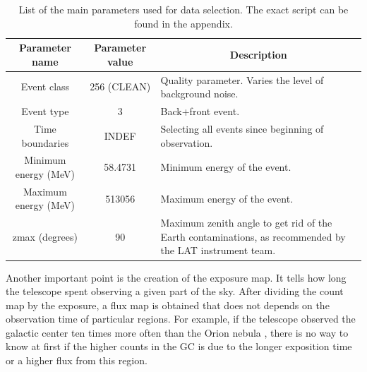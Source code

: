 \begin{center}
\begin{table}[h]
\centering
\begin{tabular}{|c|c|p{6.5cm}|}
\hline
\multicolumn{1}{|c|}{\textbf{Parameter name}} & \textbf{Parameter value} & \multicolumn{1}{c|}{\textbf{Description}}                                                                   \\ \hline
Event class                         & 256 (CLEAN)              & Quality parameter. Varies the level of background noise.                                                    \\ \hline
Event type                          & 3                        & Back+front event.                                                                                           \\ \hline
Time boundaries                     & INDEF                    & Selecting all events since beginning of observation.                                                        \\ \hline
Minimum energy (MeV)                & 58.4731                  & Minimum energy of the event.                                                                                \\ \hline
Maximum energy (MeV)                & 513056                   & Maximum energy of the event.                                                                                \\ \hline
zmax (degrees)                      & 90                       & Maximum zenith angle to get rid of the Earth contaminations, as recommended by the LAT instrument team. \\ \hline
\end{tabular}
\caption[Main parameter for Fermi data selection.]{List of the main parameters used for data selection. The exact script can be found in the appendix.}
\label{tab:fermi_selection_parameters}
\end{table}
\end{center}


Another important point is the creation of the exposure map. It tells how long the telescope spent observing a given part of the sky. After dividing the count map by the exposure, a flux map is obtained that does not depends on the observation time of particular regions. For example, if the telescope observed the galactic center ten times more often than the Orion nebula , there is no way to know at first if the higher counts in the GC is due to the longer exposition time or a higher flux from this region.

